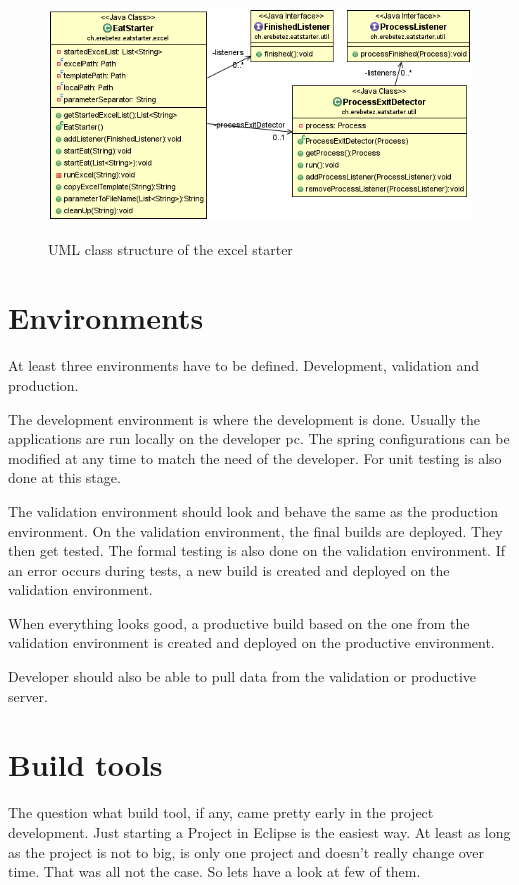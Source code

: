 \documentclass[paper=a4,twoside=false,BCOR=0mm,DIV=calc,fontsize=12pt]{scrartcl}
\begin{document}
\begin{figure}
    \begin{center}
      \includegraphics[width=1\textwidth]{./img/uml_eatstatreter_model.png}\\
    \end{center}
  \caption{UML class structure of the excel starter}
  \label{eatstarterclassuml}
\end{figure} 





\section{Environments}
At least three environments have to be defined. Development, validation and production. 

The development environment is where the development is done. Usually the applications are run locally on the developer pc. The spring configurations can be modified at any time to match the need of the developer.
For unit testing is also done at this stage.

The validation environment should look and behave the same as the production environment. On the validation environment, the final builds are deployed. They then get tested. The formal testing is also done on the validation environment. If an error occurs during tests, a new build is created and deployed on the validation environment.

When everything looks good, a productive build based on the one from the validation environment is created and deployed on the productive environment.

Developer should also be able to pull data from the validation or productive server.

\section{Build tools}
The question what build tool, if any, came pretty early in the project development. Just starting a Project in Eclipse is the easiest way. 
At least as long as the project is not to big, is only one project and doesn't really change over time. That was all not the case. So lets have a look at few of them. 
\end{document}
